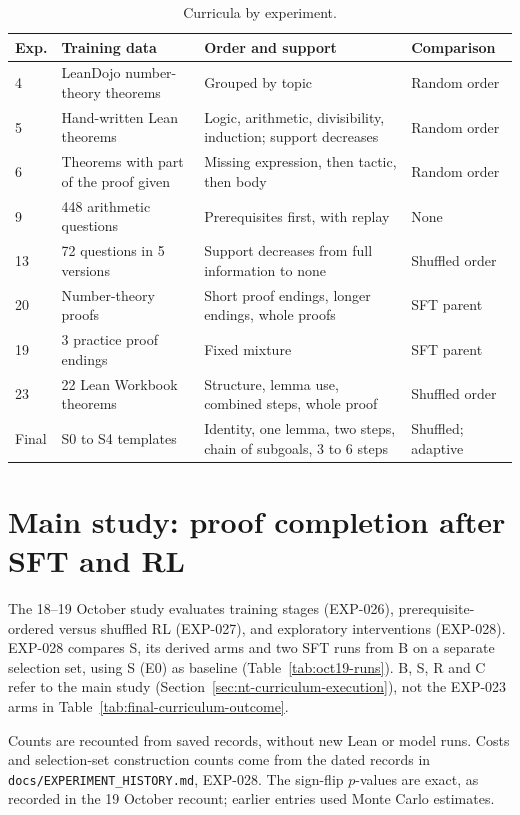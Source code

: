 \documentclass[11pt]{article}
\newcommand{\pth}[1]{\nolinkurl{#1}}
\begin{document}
\begin{table}[!htbp]
\centering
\small
\caption{Curricula by experiment.}
\label{tab:curricula}
\begin{tabularx}{\textwidth}{@{}P{1.0cm}P{4.2cm}YP{2.3cm}@{}}
\toprule
Exp. & Training data & Order and support & Comparison \\
 & LeanDojo number-theory theorems & Grouped by topic & Random order \\
5 & Hand-written Lean theorems & Logic, arithmetic, divisibility, induction; support decreases & Random order \\
6 & Theorems with part of the proof given & Missing expression, then tactic, then body & Random order \\
9 & 448 arithmetic questions & Prerequisites first, with replay & None \\
13 & 72 questions in 5 versions & Support decreases from full information to none & Shuffled order \\
20 & Number-theory proofs & Short proof endings, longer endings, whole proofs & SFT parent \\
19 & 3 practice proof endings & Fixed mixture & SFT parent \\
23 & 22 Lean Workbook theorems & Structure, lemma use, combined steps, whole proof & Shuffled order \\
Final & S0 to S4 templates & Identity, one lemma, two steps, chain of subgoals, 3 to 6 steps & Shuffled; adaptive \\
\bottomrule
\end{tabularx}
\end{table}

\section{Main study: proof completion after SFT and RL}
\label{sec:oct19-results}

The 18--19 October study evaluates training stages (EXP-026), prerequisite-ordered versus shuffled RL (EXP-027), and exploratory interventions (EXP-028).
EXP-028 compares S, its derived arms and two SFT runs from B on a separate selection set, using S (E0) as baseline (Table~\ref{tab:oct19-runs}).
B, S, R and C refer to the main study (Section~\ref{sec:nt-curriculum-execution}), not the EXP-023 arms in Table~\ref{tab:final-curriculum-outcome}.

Counts are recounted from saved records, without new Lean or model runs.
Costs and selection-set construction counts come from the dated records in \pth{docs/EXPERIMENT_HISTORY.md}, EXP-028.
The sign-flip $p$-values are exact, as recorded in the 19 October recount; earlier entries used Monte Carlo estimates.
\end{document}

